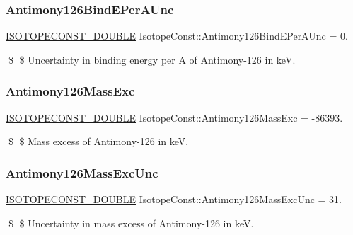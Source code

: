\subsubsection{\texorpdfstring{Antimony126\+Bind\+E\+Per\+A\+Unc}{Antimony126BindEPerAUnc}}
{\footnotesize\ttfamily \mbox{\hyperlink{group___isotope_const-_macros_ga8f45a7272ce02c0b4c65c44636ed719a}{I\+S\+O\+T\+O\+P\+E\+C\+O\+N\+S\+T\+\_\+\+D\+O\+U\+B\+LE}} Isotope\+Const\+::\+Antimony126\+Bind\+E\+Per\+A\+Unc = 0.}

\$ \$ Uncertainty in binding energy per A of Antimony-\/126 in keV. \mbox{\label{group___isotope_const-_antimony-_sb126_ga5f8c636a903589636ff0644ad1403d25}} 
\subsubsection{\texorpdfstring{Antimony126\+Mass\+Exc}{Antimony126MassExc}}
{\footnotesize\ttfamily \mbox{\hyperlink{group___isotope_const-_macros_ga8f45a7272ce02c0b4c65c44636ed719a}{I\+S\+O\+T\+O\+P\+E\+C\+O\+N\+S\+T\+\_\+\+D\+O\+U\+B\+LE}} Isotope\+Const\+::\+Antimony126\+Mass\+Exc = -\/86393.}

\$ \$ Mass excess of Antimony-\/126 in keV. \mbox{\label{group___isotope_const-_antimony-_sb126_ga7728bad2618ed23a355b226253c4b12b}} 
\subsubsection{\texorpdfstring{Antimony126\+Mass\+Exc\+Unc}{Antimony126MassExcUnc}}
{\footnotesize\ttfamily \mbox{\hyperlink{group___isotope_const-_macros_ga8f45a7272ce02c0b4c65c44636ed719a}{I\+S\+O\+T\+O\+P\+E\+C\+O\+N\+S\+T\+\_\+\+D\+O\+U\+B\+LE}} Isotope\+Const\+::\+Antimony126\+Mass\+Exc\+Unc = 31.}

\$ \$ Uncertainty in mass excess of Antimony-\/126 in keV. \mbox{\label{group___isotope_const-_antimony-_sb126_gac0e9353e176bbfdf743afb28af65f043}} 
